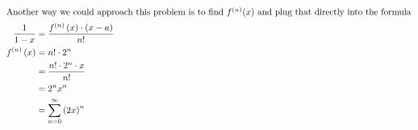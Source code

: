 \documentclass[12pt]{article}
\begin{document}
\begin{align}
  \intertext{Another way we could approach this problem is to find $f^{(n)}(x)$ and plug that directly into the formula}
  \frac{1}{1-x}                    & =\frac{f^{\left(n\right)}\left(x\right)\cdot\left(x-a\right)}{n!}                       \\
  f^{\left(n\right)}\left(x\right) & =n!\cdot2^{n}                                                                           \\
                                   & =\frac{n!\cdot2^{n}\cdot x}{n!}                                                         \\
                                   & =2^{n}x^{n}                                                                             \\
                                   & =\sum_{n=0}^{\infty}\left(2x\right)^{n}                                                                    \\
\end{align}
\end{document}
